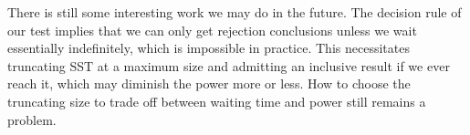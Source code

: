 \documentclass[letterpaper]{article} %
\begin{document}
There is still some interesting work we may do in the future. The decision rule of our test implies that we can only get rejection conclusions unless we wait essentially indefinitely, which is impossible in practice. This necessitates truncating SST at a maximum size and admitting an inclusive result if we ever reach it, which may diminish the power more or less. How to choose the truncating size to trade off between waiting time and power still remains a problem. 



\end{document}
